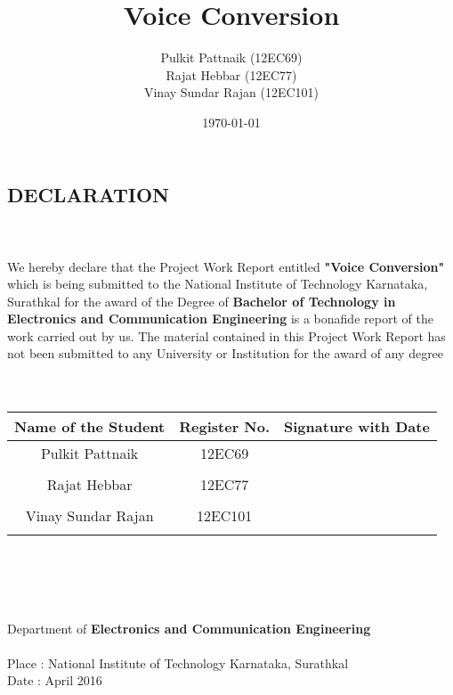 \documentclass[BTech]{nitkdiss}
\title{Voice Conversion}
\author{Pulkit Pattnaik (12EC69)\\ Rajat Hebbar (12EC77)\\ Vinay Sundar Rajan (12EC101)\\}
\date{\today}
\begin{document}
\maketitle
\newpage
\singlespacing
\begin{center}
\section*{DECLARATION}
\end{center}
\\
\\
\hspace{1cm}   We hereby declare that the Project Work Report entitled \textbf{"Voice Conversion"} which is being submitted to the National Institute of Technology Karnataka, Surathkal for the award of the Degree of \textbf{Bachelor of Technology in Electronics and Communication Engineering} is a bonafide report of the work carried out by us. The material contained in this Project Work Report has not been submitted to any University or Institution for the award of any degree
\\
\\
\\

\begin{center}


\begin{tabular}{ccc}

\hline
Name of the Student & Register No. & Signature with Date 			\\
\hline
Pulkit Pattnaik			&12EC69		&							\\\\
Rajat Hebbar			&12EC77		&							\\\\
Vinay Sundar Rajan		&12EC101		&							\\\\
\hline
\end{tabular}
\end{center}
\\
\\
\\
\\
Department of \textbf{Electronics and Communication Engineering}
\\
\\
Place : National Institute of Technology Karnataka, Surathkal
\\
Date : April 2016
\end{document}
